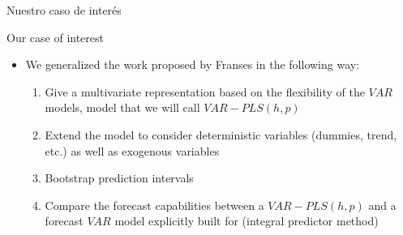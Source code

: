 \documentclass{beamer}
\newcommand{\?}{?`}
\begin{document}
\begin{frame}{Nuestro caso de inter\'es}
  \begin{figure}[htbp]
\end{figure}
\end{frame}

\begin{frame}{Our case of interest}
  \begin{itemize}
    \item We generalized the work proposed by Franses in the following way:
    \bigskip
    
      \begin{enumerate}
      \item Give a multivariate representation based on the flexibility of the $VAR$ models, model that we will call $VAR-PLS(h,p)$
      \item Extend the model to consider deterministic variables (dummies, trend, etc.) as well as exogenous variables
      \item Bootstrap prediction intervals
      \item Compare the forecast capabilities between a $VAR-PLS(h,p)$ and a forecast $VAR$ model explicitly built for (integral predictor method)
            \end{enumerate}
  \end{itemize}
\end{frame}
\end{document}
